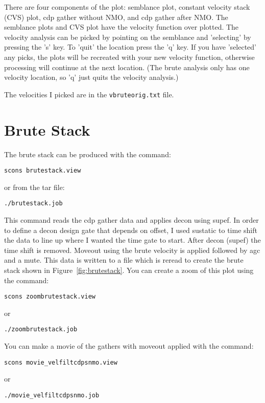 There are four components of the plot: semblance plot, constant velocity 
stack (CVS) plot, cdp gather without NMO, and cdp gather after NMO.  The 
semblance plots and CVS plot have the velocity function over plotted.  
The velocity analysis can be picked by pointing on the semblance and 
'selecting' by pressing the 's' key.  To 'quit' the location press the 
'q' key.  If you have 'selected' any picks, the plots will be recreated 
with your new velocity function, otherwise processing will continue at 
the next location.  (The brute analysis only has one velocity location, 
so 'q' just quits the velocity analysis.)

The velocities I picked are in the \texttt{vbruteorig.txt} file.


\section{Brute Stack}
The brute stack can be produced with the command: 
\begin{verbatim}
scons brutestack.view
\end{verbatim}
or from the tar file:
\begin{verbatim}
./brutestack.job
\end{verbatim}

This command reads the cdp gather data and applies decon using supef.  In 
order to define a decon design gate that depends on offset, I used sustatic 
to time shift the data to line up where I wanted the time gate to start.  
After decon (supef) the time shift is removed.  Moveout using the brute 
velocity is applied followed by agc and a mute.  This data is written to a 
file which is reread to create the brute stack shown in 
Figure~\ref{fig:brutestack}.  You can create a zoom of this plot using the 
command:
\begin{verbatim}
scons zoombrutestack.view
\end{verbatim}
or
\begin{verbatim}
./zoombrutestack.job
\end{verbatim}

You can make a movie of the gathers with moveout applied with the
command: 
\begin{verbatim}
scons movie_velfiltcdpsnmo.view
\end{verbatim}
or
\begin{verbatim}
./movie_velfiltcdpsnmo.job
\end{verbatim}

